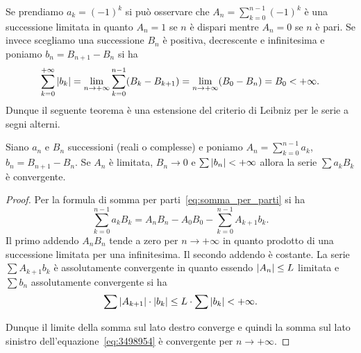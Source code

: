 Se prendiamo $a_k=(-1)^k$ si può osservare che $A_n = \sum_{k=0}^{n-1} (-1)^k$
è una successione limitata in quanto $A_n = 1$ se $n$ è dispari mentre
$A_n=0$ se $n$ è pari.
Se invece scegliamo una successione $B_n$ è positiva,
decrescente e infinitesima
e poniamo $b_n = B_{n+1}-B_n$
si ha
\[
  \sum_{k=0}^{+\infty} {\left|b_k\right|}
  = \lim_{n\to+\infty}\sum_{k=0}^{n-1} (B_k-B_{k+1})
  = \lim_{n\to +\infty} (B_0 - B_n) = B_0 < +\infty.
\]
Dunque il seguente teorema è una estensione del criterio
di Leibniz per le serie a segni alterni.

\begin{theorem}%
\label{th:dirichlet}%
Siano $a_n$ e $B_n$ successioni (reali o complesse)
e poniamo $\displaystyle A_n = \sum_{k=0}^{n-1} a_k$,
$b_n = B_{n+1} - B_n$.
Se $A_n$ è limitata,
$B_n\to 0$
e $\sum {\left|b_n\right|} < +\infty$
allora la serie $\sum a_k B_k$ è convergente.
\end{theorem}
%
\begin{proof}
Per la formula di somma per parti~\eqref{eq:somma_per_parti}
 si ha
\begin{equation}\label{eq:3498954}
 \sum_{k=0}^{n-1} a_k B_k
 = A_n B_n - A_0 B_0 - \sum_{k=0}^{n-1} A_{k+1}b_k.
\end{equation}
Il primo addendo $A_n B_n$ tende a zero per $n\to +\infty$
in quanto prodotto di una successione limitata per una infinitesima.
Il secondo addendo è costante.
La serie $\sum A_{k+1} b_k$ è assolutamente convergente
in quanto essendo ${\left|A_n\right|}\le L$ limitata
e $\sum b_n$ assolutamente convergente si ha
\[
  \sum {\left|A_{k+1}\right|} \cdot {\left|b_k\right|}
  \le L \cdot \sum {\left|b_k\right|} < +\infty.
\]

Dunque il limite della somma sul lato destro converge e quindi
la somma sul lato sinistro
dell'equazione~\eqref{eq:3498954}
è convergente per $n\to +\infty$.
\end{proof}

